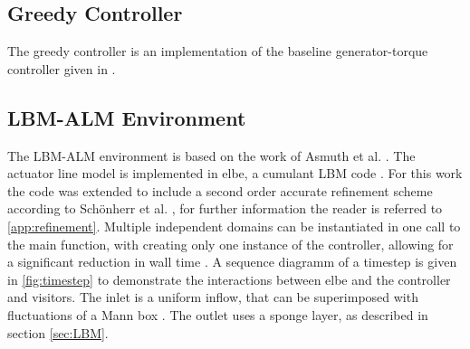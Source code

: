 \subsection{Greedy Controller}
The greedy controller is an implementation of the baseline generator-torque controller given in \cite{jonkman_definition_2009}.
\subsection{LBM-ALM Environment}
The LBM-ALM environment is based on the work of Asmuth et al. \cite{asmuth_actuator_2019}. The actuator line model is implemented in elbe, a cumulant LBM code \cite{jansen_validation_2015}. For this work the code was extended to include a second order accurate refinement scheme according to Schönherr et al. \cite{schonherr_towards_2015}, for further information the reader is referred to \ref{app:refinement}. Multiple independent domains can be instantiated in one call to the main function, with creating only one instance of the controller, allowing for a significant reduction in wall time \cite{rabault_accelerating_2019-1}. A sequence diagramm of a timestep is given in \ref{fig:timestep} to demonstrate the interactions between elbe and the controller and visitors. The inlet is a uniform inflow, that can be superimposed with fluctuations of a Mann box \cite{mann_wind_1998}. The outlet uses a sponge layer, as described in section \ref{sec:LBM}.

